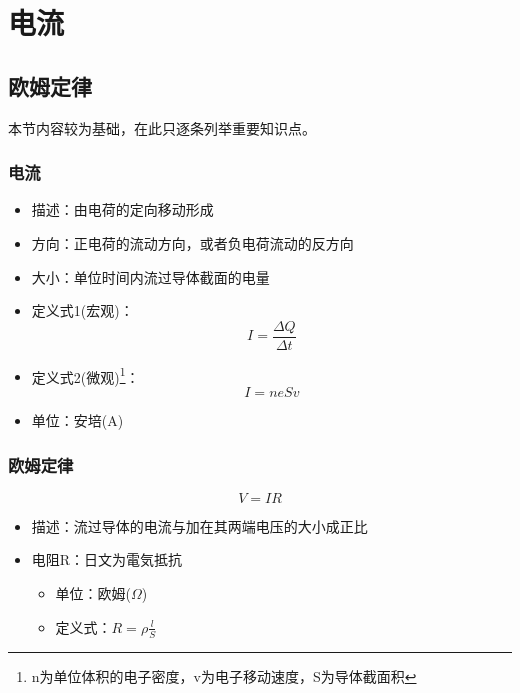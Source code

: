 
\section{电流}

\subsection{欧姆定律}

本节内容较为基础，在此只逐条列举重要知识点。

\subsubsection{电流}

\begin{itemize}
    \item 描述：由电荷的定向移动形成
    \item 方向：正电荷的流动方向，或者负电荷流动的反方向
    \item 大小：单位时间内流过导体截面的电量
    \item 定义式1(宏观)：
    \begin{equation*}
        I=\frac{\Delta Q}{\Delta t}
    \end{equation*}
    \item 定义式2(微观)\footnote{n为单位体积的电子密度，v为电子移动速度，S为导体截面积}：
    \begin{equation*}
        I=neSv
    \end{equation*}
    \item 单位：安培(A)
\end{itemize}

\subsubsection{欧姆定律}

\begin{equation*}
    V=IR
\end{equation*}
\begin{itemize}
    \item 描述：流过导体的电流与加在其两端电压的大小成正比
    \item 电阻R：日文为電気抵抗
    \begin{itemize}
        \item 单位：欧姆($\Omega$)
        \item 定义式：$R=\rho\frac{l}{S}$
    \end{itemize}
\end{itemize}

